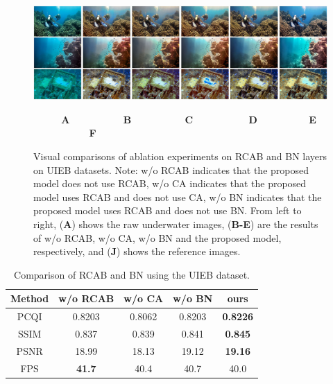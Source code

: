 \documentclass[utf8]{FrontiersinHarvard} %
\begin{document}
\begin{figure}[htbp]
\begin{center}
\includegraphics[width=1\textwidth]{FSpiralGAN_frontiers/onepicture/abalation_BN300.jpg}
\end{center}
$~~~~~~~~~~~~~$\textbf{A}$~~~~~~~~~~~~~~~~~~~~~~~~~$\textbf{B}$~~~~~~~~~~~~~~~~~~~~~~~~~$\textbf{C}$~~~~~~~~~~~~~~~~~~~~~~~~~~$\textbf{D}$~~~~~~~~~~~~~~~~~~~~~~~~$\textbf{E}$~~~~~~~~~~~~~~~~~~~~~~~~~~$\textbf{F}
 \caption{Visual comparisons of ablation experiments on RCAB and BN layers on UIEB datasets. Note: w/o RCAB indicates that the proposed model does not use RCAB, w/o CA indicates that the proposed model uses RCAB and does not use CA, w/o BN indicates that the proposed model uses RCAB and does not use BN. From left to right, (\textbf{A}) shows the raw underwater images, (\textbf{B-E}) are the results of w/o RCAB, w/o CA, w/o BN and the proposed model, respectively, and (\textbf{J}) shows the reference images. \label{fig:ablationRCABandBN-UIEBD}}
\end{figure}

\begin{table}[htbp]\normalsize
\centering
\setlength\tabcolsep{7pt}
\caption{{Comparison of RCAB and BN using the UIEB dataset.}}
\begin{tabular}{c|cccc}
\hline  
Method&w/o RCAB&w/o CA&w/o BN&ours\\
\hline 
PCQI&0.8203&0.8062&0.8203&\textbf{0.8226}\\
\hline
SSIM&0.837&0.839&0.841&\textbf{0.845}\\ 
\hline
PSNR&18.99&18.13&19.12&\textbf{19.16}\\
\hline 
FPS&\textbf{41.7}&40.4&40.7&40.0\\
\hline
\end{tabular}
\label{tbl:ablationRCABandBN-UIEBD}
\end{table}
\end{document}

